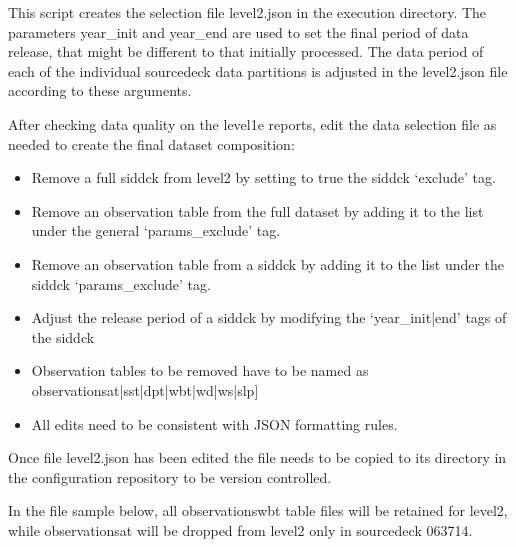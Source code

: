 \documentclass[letterpaper,10pt,english]{sphinxmanual}
\begin{document}
This script creates the selection file level2.json in the execution directory.
The parameters year\_init and year\_end are used to set the final period of data
release, that might be different to that initially processed. The data period of
each of the individual source\sphinxhyphen{}deck data partitions is adjusted in the level2.json
file according to these arguments.

After checking data quality on the level1e
reports, edit the data selection file as needed to create the final dataset
composition:
\begin{itemize}
\item {} 
Remove a full sid\sphinxhyphen{}dck from level2 by setting to true the sid\sphinxhyphen{}dck ‘exclude’ tag.

\item {} 
Remove an observation table from the full dataset by adding it to the list under the general ‘params\_exclude’ tag.

\item {} 
Remove an observation table from a sid\sphinxhyphen{}dck by adding it to the list under the sid\sphinxhyphen{}dck ‘params\_exclude’ tag.

\item {} 
Adjust the release period of a sid\sphinxhyphen{}dck by modifying the ‘year\_init|end’ tags of the sid\sphinxhyphen{}dck

\item {} 
Observation tables to be removed have to be named as observations\sphinxhyphen{}{[}at|sst|dpt|wbt|wd|ws|slp{]}

\item {} 
All edits need to be consistent with JSON formatting rules.

\end{itemize}

Once file level2.json has been edited the file needs to be copied to its
directory in the configuration repository to be version controlled.

In the file sample below, all observations\sphinxhyphen{}wbt table files will be retained for
level2, while observations\sphinxhyphen{}at will be dropped from level2 only in source\sphinxhyphen{}deck
063\sphinxhyphen{}714.
\end{document}
